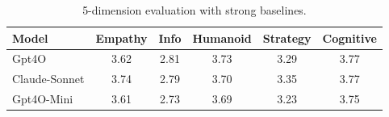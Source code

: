 \begin{table}[t]
\centering
\caption{5-dimension evaluation with strong baselines.}
\label{tab:5dim_baselines}
\begin{tabular}{lccccc}
\toprule
Model & Empathy & Info & Humanoid & Strategy & Cognitive \\
\midrule
Gpt4O & 3.62 & 2.81 & 3.73 & 3.29 & 3.77 \\
Claude-Sonnet & 3.74 & 2.79 & 3.70 & 3.35 & 3.77 \\
Gpt4O-Mini & 3.61 & 2.73 & 3.69 & 3.23 & 3.75 \\
\bottomrule
\end{tabular}
\end{table}
